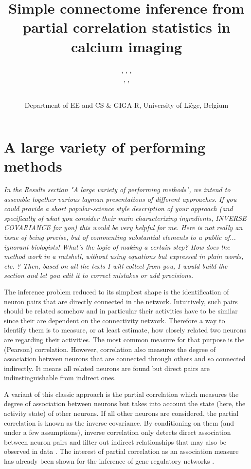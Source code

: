 \documentclass[wcp]{jmlr}
\title{Simple connectome inference from partial correlation statistics in calcium imaging}
\author{\Name{Antonio Sutera},
   \Name{Arnaud Joly},
   \Name{Vincent François-Lavet}, \Email{a.sutera@ulg.ac.be}\\
   \Name{Zixiao Aaron Qiu},
   \Name{Gilles Louppe},
   \Name{Damien Ernst}\and\Name{Pierre Geurts}
    \\
   \addr Department of EE and CS \& GIGA-R, University of Li\`ege, Belgium}
\begin{document}
\section{A large variety of performing methods}

\emph{
In the Results section "A large variety of performing methods", we intend to
assemble together various layman presentations of different approaches. If you
could provide a short popular-science style description of your approach (and
specifically of what you consider their main characterizing ingredients,
INVERSE COVARIANCE for you) this would be very helpful for me.  Here is not
really an issue of being precise, but of commenting substantial elements to a
public of... ignorant biologists! What's the logic of making a certain step?
How does the method work in a nutshell, without using equations but expressed
in plain words, etc. ? Then, based on all the texts I will collect from you, I
would build the section and let you edit it to correct mistakes or add
precisions.\\
}

The inference problem reduced to its simpliest shape is the identification of
neuron pairs that are directly connected in the network. Intuitively, such
pairs should be related somehow and in particular their activities have to be
similar since their are dependent on the connectivity network. Therefore a way
to identify them is to measure, or at least estimate, how closely related two
neurons are regarding their activities. The most common measure for that
purpose is the (Pearson) correlation.  However, correlation also measures the
degree of association between neurons that are connected through others and so 
connected indirectly. It means all related neurons are found but direct pairs
are indinstinguishable from indirect ones.

A variant of this classic approach is the partial correlation which measures
the degree of association between neurons but takes into account the state
(here, the activity state) of other neurons. If all other neurons are
considered, the partial correlation is known as the inverse covariance. By
conditioning on them (and under a few assumptions), inverse correlation only
detects direct association between neuron pairs and filter out indirect
relationships that may also be observed in data \citep{sutera2014simple}. The
interest of partial correlation as an association measure has already been
shown for the inference of gene regulatory networks \citep{de2004discovery,Schafer:2005}.
\end{document}
